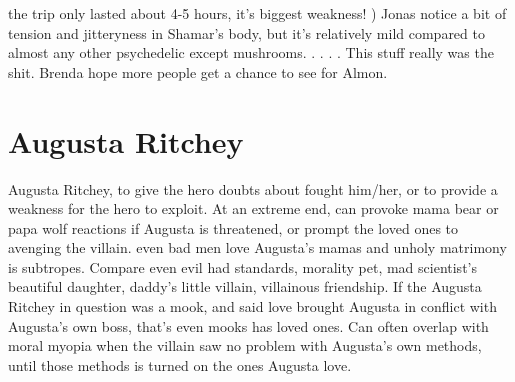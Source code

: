 \documentclass[12pt]{book}
\begin{document}
the trip only lasted about 4-5 hours, it's biggest weakness! ) Jonas notice a bit of tension and jitteryness in Shamar's body, but it's relatively mild compared to almost any other psychedelic except mushrooms.  . . .  . This stuff really was the shit. Brenda hope more people get a chance to see for Almon.



\chapter{Augusta Ritchey}

Augusta Ritchey, to give the hero doubts about fought him/her, or to provide a weakness for the hero to exploit. At an extreme end, can provoke mama bear or papa wolf reactions if Augusta is threatened, or prompt the loved ones to avenging the villain. even bad men love Augusta's mamas and unholy matrimony is subtropes. Compare even evil had standards, morality pet, mad scientist's beautiful daughter, daddy's little villain, villainous friendship. If the Augusta Ritchey in question was a mook, and said love brought Augusta in conflict with Augusta's own boss, that's even mooks has loved ones. Can often overlap with moral myopia when the villain saw no problem with Augusta's own methods, until those methods is turned on the ones Augusta love.
\end{document}
